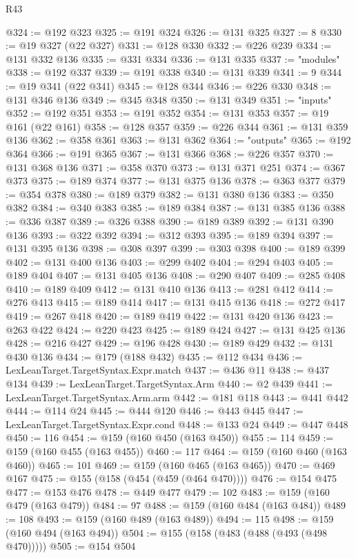 \begin{lexlean}{R43}
\begin{coremodule}
@324 := @192 @323
@325 := @191 @324
@326 := @131 @325
@327 := 8
@330 := @19 @327 (@22 @327)
@331 := @128 @330
@332 := @226 @239
@334 := @131 @332 @136
@335 := @331 @334
@336 := @131 @335
@337 := "modules"
@338 := @192 @337
@339 := @191 @338
@340 := @131 @339
@341 := 9
@344 := @19 @341 (@22 @341)
@345 := @128 @344
@346 := @226 @330
@348 := @131 @346 @136
@349 := @345 @348
@350 := @131 @349
@351 := "inputs"
@352 := @192 @351
@353 := @191 @352
@354 := @131 @353
@357 := @19 @161 (@22 @161)
@358 := @128 @357
@359 := @226 @344
@361 := @131 @359 @136
@362 := @358 @361
@363 := @131 @362
@364 := "outputs"
@365 := @192 @364
@366 := @191 @365
@367 := @131 @366
@368 := @226 @357
@370 := @131 @368 @136
@371 := @358 @370
@373 := @131 @371 @251
@374 := @367 @373
@375 := @189 @374
@377 := @131 @375 @136
@378 := @363 @377
@379 := @354 @378
@380 := @189 @379
@382 := @131 @380 @136
@383 := @350 @382
@384 := @340 @383
@385 := @189 @384
@387 := @131 @385 @136
@388 := @336 @387
@389 := @326 @388
@390 := @189 @389
@392 := @131 @390 @136
@393 := @322 @392
@394 := @312 @393
@395 := @189 @394
@397 := @131 @395 @136
@398 := @308 @397
@399 := @303 @398
@400 := @189 @399
@402 := @131 @400 @136
@403 := @299 @402
@404 := @294 @403
@405 := @189 @404
@407 := @131 @405 @136
@408 := @290 @407
@409 := @285 @408
@410 := @189 @409
@412 := @131 @410 @136
@413 := @281 @412
@414 := @276 @413
@415 := @189 @414
@417 := @131 @415 @136
@418 := @272 @417
@419 := @267 @418
@420 := @189 @419
@422 := @131 @420 @136
@423 := @263 @422
@424 := @220 @423
@425 := @189 @424
@427 := @131 @425 @136
@428 := @216 @427
@429 := @196 @428
@430 := @189 @429
@432 := @131 @430 @136
@434 := @179 (@188 @432)
@435 := @112 @434
@436 := LexLeanTarget.TargetSyntax.Expr.match
@437 := @436 @11
@438 := @437 @134
@439 := LexLeanTarget.TargetSyntax.Arm
@440 := @2 @439
@441 := LexLeanTarget.TargetSyntax.Arm.arm
@442 := @181 @118
@443 := @441 @442
@444 := @114 @24
@445 := @444 @120
@446 := @443 @445
@447 := LexLeanTarget.TargetSyntax.Expr.cond
@448 := @133 @24
@449 := @447 @448
@450 := 116
@454 := @159 (@160 @450 (@163 @450))
@455 := 114
@459 := @159 (@160 @455 (@163 @455))
@460 := 117
@464 := @159 (@160 @460 (@163 @460))
@465 := 101
@469 := @159 (@160 @465 (@163 @465))
@470 := @469 @167
@475 := @155 (@158 (@454 (@459 (@464 @470))))
@476 := @154 @475
@477 := @153 @476
@478 := @449 @477
@479 := 102
@483 := @159 (@160 @479 (@163 @479))
@484 := 97
@488 := @159 (@160 @484 (@163 @484))
@489 := 108
@493 := @159 (@160 @489 (@163 @489))
@494 := 115
@498 := @159 (@160 @494 (@163 @494))
@504 := @155 (@158 (@483 (@488 (@493 (@498 @470)))))
@505 := @154 @504

\end{coremodule}
\end{lexlean}

